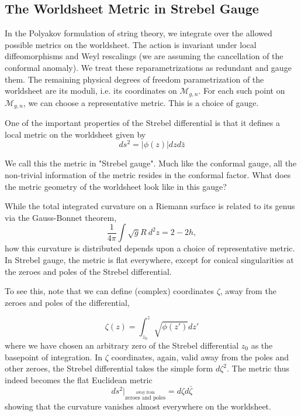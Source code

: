 \documentclass[english]{article}
\renewcommand{\>}{\rangle}
\newcommand{\<}{\langle}
\renewcommand{\(}{\left(}
\renewcommand{\)}{\right)}
\begin{document}
\subsection{The Worldsheet Metric in Strebel Gauge} \label{sec:strebelmetric}

In the Polyakov formulation of string theory, we integrate over the allowed possible metrics on the worldsheet. The action is invariant under local diffeomorphisms and Weyl rescalings (we are assuming the cancellation of the conformal anomaly). We treat these reparametrizations as redundant and gauge them. The remaining physical degrees of freedom parametrization of the worldsheet are its moduli, i.e. its coordinates on $\mathcal{M}_{g,n}$. For each such point on $\mathcal{M}_{g,n}$, we can choose a representative metric. This is a choice of gauge.

One of the important properties of the Strebel differential is that it defines a local metric on the worldsheet given by 
\begin{equation}
    ds^2 = |\phi(z)| dz d\bar{z} \label{eq:StrebelMetric}
\end{equation}
 
We call this the metric in "Strebel gauge". Much like the conformal gauge, all the non-trivial information of the metric resides in the conformal factor. What does the metric geometry of the worldsheet look like in this gauge? 


While the total integrated curvature on a Riemann surface is related to its genus via the Gauss-Bonnet theorem,
\begin{equation}
    \frac{1}{4\pi} \int \sqrt{g} R \ d^2z = 2-2h,
\end{equation}
how this curvature is distributed depends upon a choice of representative metric. In Strebel gauge, the metric is flat everywhere, except for conical singularities at the zeroes and poles of the Strebel differential. 

To see this, note that we can define (complex) coordinates $\zeta$, away from the zeroes and poles of the differential,

\begin{equation}
    \zeta(z) = \int_{z_{0}}^{z} \sqrt{\phi(z')} dz'
\end{equation}
where we have chosen an arbitrary zero of the Strebel differential $z_{0}$ as the basepoint of integration. In $\zeta$ coordinates, again, valid away from the poles and other zeroes, the Strebel differential takes the simple form $d\zeta^2$. The metric thus indeed becomes the flat Euclidean metric
 \begin{equation}
     ds^2\big|_{\overset{\text{away from}}{\text{zeroes and poles}}} = d\zeta d\bar{\zeta}
 \end{equation}
 showing that the curvature vanishes almost everywhere on the worldsheet.
\end{document}

